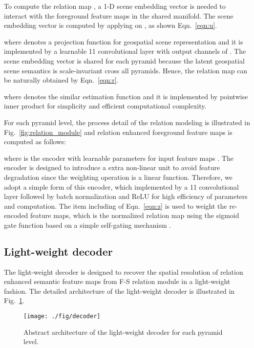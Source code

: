 \documentclass[10pt,twocolumn,letterpaper]{article}
\begin{document}
To compute the relation map , a 1-D scene embedding vector  is needed to interact with the foreground feature maps  in the shared manifold.
The scene embedding vector  is computed by applying  on , as shown Eqn.~\ref{eqn:u}.

where  denotes a projection function for geospatial scene representation and it is implemented by a learnable 11 convolutional layer with output channels of .
The scene embedding vector  is shared for each pyramid because the latent geospatial scene semantics is scale-invariant cross all pyramids.
Hence, the relation map  can be naturally obtained by Eqn.~\ref{eqn:r}.

where  denotes the similar estimation function and it is implemented by pointwise inner product for simplicity and efficient computational complexity.


For each pyramid level, the process detail of the relation modeling is illustrated in Fig.~\ref{fig:relation_module} and relation enhanced foreground feature maps  is computed as follows:

where  is the encoder with learnable parameters  for input feature maps .
The encoder is designed to introduce a extra non-linear unit to avoid feature degradation since the weighting operation is a linear function.
Therefore, we adopt a simple form of this encoder, which implemented by a 11 convolutional layer followed by batch normalization and ReLU for high efficiency of parameters and computation.
The item including  of Eqn.~\ref{eqn:z} is used to weight the re-encoded feature maps,
which is the normalized relation map using the sigmoid gate function based on a simple self-gating mechanism \cite{hu2018squeeze}.




\subsection{Light-weight decoder}
The light-weight decoder is designed to recover the spatial resolution of relation enhanced semantic feature maps from F-S relation module in a light-weight fashion.
The detailed architecture of the light-weight decoder is illustrated in Fig.~\ref{fig:decoder}.

\begin{figure}[hbt]
   \begin{center}
      \texttt{[image: ./fig/decoder]}
   \end{center}
   \caption{Abstract architecture of the light-weight decoder for each pyramid level.}
   \label{fig:decoder}
\end{figure}
\end{document}
